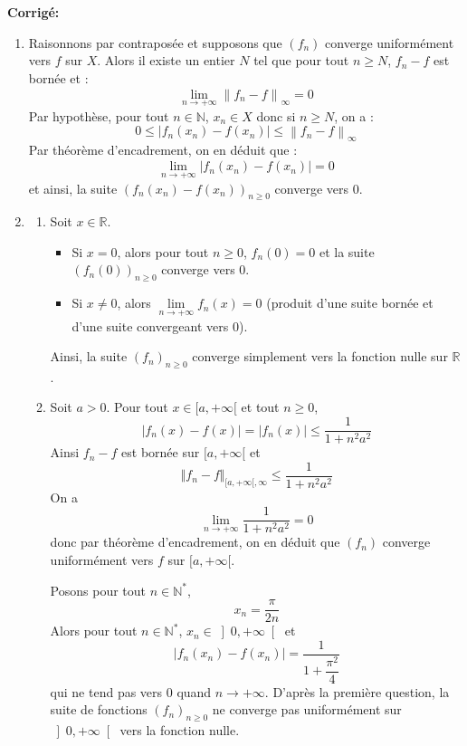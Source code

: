 \documentclass[a4paper,twoside,french,11pt]{VcCours}
\newcommand{\corr}{\textbf{Corrigé:}}
\begin{document}
\corr \begin{enumerate}

\item Raisonnons par contraposée et supposons que $(f_n)$ converge uniformément vers $f$ sur $X$. Alors il existe un entier $N$ tel que pour tout $n\geq N$, $f_n-f$ est bornée et :
$$\lim\limits_{n\to+\infty}^{}\left\| {f_n  - f} \right\|_\infty   = 0$$
Par hypothèse, pour tout $n\in\mathbb{N}$, $x_n\in X$ donc si $n \geq N$, on a :
$$0 \leq \left| {f_n (x_n ) - f(x_n )} \right| \leqslant \left\| {f_n  - f} \right\|_\infty  $$
Par théorème d'encadrement, on en déduit que :
$$\lim\limits_{n\to+\infty}^{}\left| {f_n (x_n ) - f(x_n )} \right|=0$$
et ainsi, la suite $( {f_n (x_n ) - f(x_n )})_{n \geq 0}$ converge vers $0$.

\item
\begin{enumerate}
\item Soit $x\in\mathbb{R}$.
\begin{itemize}
\item Si $x=0$, alors pour tout $n \geq 0$, $f_n(0)=0$ et la suite $(f_n(0))_{n \geq 0}$ converge vers $0$.
\item Si $x \neq 0$, alors $\lim\limits_{n\to+\infty}^{}f_n (x)=0$ (produit d'une suite bornée et d'une suite convergeant vers $0$).
\end{itemize}
Ainsi, la suite $(f_n)_{n \geq 0}$ converge simplement vers la fonction nulle sur $\mathbb{R}$.
\item Soit $a>0$. Pour tout $x \in [a, + \infty[$ et tout $n \geq 0$,
$$\left| {f_n (x)} -f(x)\right|=|f_n(x)| \leq \dfrac{1}{{1 + n^2a^2  }}$$
Ainsi $f_n-f$ est bornée sur $[a, + \infty[$ et 
$$ \Vert f_n -f \Vert_{[a, + \infty[, \infty} \leq \dfrac{1}{{1 + n^2a^2  }}$$
On a 
$$\lim\limits_{n\to+\infty}^{}\dfrac{1}{{1 + n^2a^2  }}=0$$
donc par théorème d'encadrement, on en déduit que $(f_n)$ converge uniformément vers $f$ sur $[a, + \infty[$.

\medskip

Posons pour tout $n\in\mathbb{N}^*$, 
$$x_n  = \dfrac{\pi}{2n}$$
Alors pour tout $n \in \mathbb{N}^*$, $x_n\in \left]  0,+\infty\right[$ et  
$$|f_n (x_n )-f(x_n)| = \dfrac{1}{{1 + \dfrac{{\pi ^2 }}{4}}}$$
qui ne tend pas vers 0 quand $n\rightarrow +\infty$. D'après la première question, la suite de fonctions $(f_n)_{n \geq 0}$ ne converge pas uniformément sur $\left] {0, + \infty } \right[$ vers la fonction nulle.
\end{enumerate}
\end{enumerate}
\end{document}
